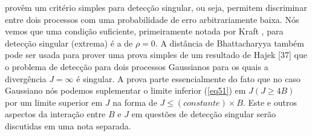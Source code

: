 \documentclass{sbrt2017port}
\begin{document}
provêm um critério simples para detecção singular, ou seja, permitem discriminar entre dois processos com uma probabilidade de erro arbitrariamente baixa. Nós vemos que uma condição suficiente, primeiramente notada por Kraft \cite{r24}, para detecção singular (extrema) é a de $\rho = 0$. A distância de Bhattacharyya também pode ser usada para prover uma prova simples de um resultado de Hajek [37] que o problema de detecção para dois processos Gaussianos para os quais a divergência $J = \infty$ é singular. A prova parte essencialmente do fato que no caso Gaussiano nós podemos suplementar o limite inferior (\ref{eq51}) em $J(J \geq 4B)$ por um limite superior em $J$ na forma de $J \leq (constante)\times B$. Este e outros aspectos da interação entre $B$ e $J$ em questões de detecção singular serão discutidas em uma nota separada.
\end{document}
